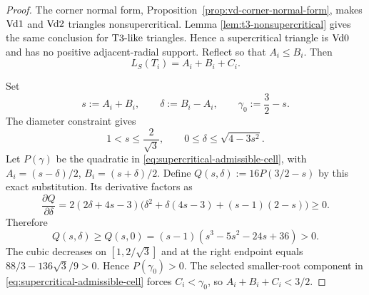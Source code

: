 \begin{proof}
The corner normal form, Proposition~\ref{prop:vd-corner-normal-form}, makes
$\mathrm{Vd1}$ and $\mathrm{Vd2}$ triangles nonsupercritical.  Lemma
\ref{lem:t3-nonsupercritical} gives the same conclusion for $\mathrm{T3\text{-}like}$
triangles.  Hence a supercritical triangle is $\mathrm{Vd0}$ and has no positive
adjacent-radial support.  Reflect so that $A_i\le B_i$.
Then
\[
 L_S(T_i)=A_i+B_i+C_i.
\]

Set
\[
 s:=A_i+B_i,\qquad \delta:=B_i-A_i,
 \qquad \gamma_0:=\frac32-s.
\]
The diameter constraint gives
\[
 1<s\le\frac2{\sqrt3},
 \qquad0\le\delta\le\sqrt{4-3s^2}.
\]
Let $P(\gamma)$ be the quadratic in
\eqref{eq:supercritical-admissible-cell}, with
$A_i=(s-\delta)/2$, $B_i=(s+\delta)/2$. Define
$Q(s,\delta):=16P(3/2-s)$ by this exact substitution.
Its derivative factors as
\[
 \frac{\partial Q}{\partial\delta}
 =2(2\delta+4s-3)
 \bigl(\delta^2+\delta(4s-3)+(s-1)(2-s)\bigr)\ge0.
\]
Therefore
\[
 Q(s,\delta)\ge Q(s,0)
 =(s-1)(s^3-5s^2-24s+36)>0.
\]
The cubic decreases on $[1,2/\sqrt3]$ and at the right endpoint equals
$88/3-136\sqrt3/9>0$.  Hence $P(\gamma_0)>0$.  The selected smaller-root
component in \eqref{eq:supercritical-admissible-cell} forces
$C_i<\gamma_0$, so $A_i+B_i+C_i<3/2$.
\end{proof}
